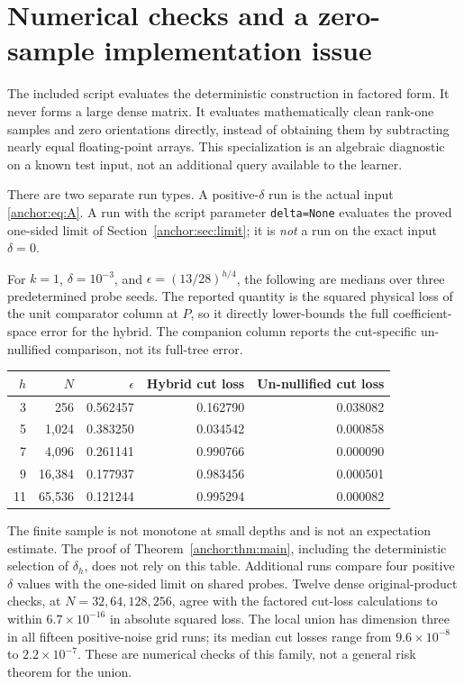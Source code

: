 \documentclass[11pt,oneside,openany,a4paper]{book}
\numberwithin{equation}{chapter}
\theoremstyle{definition}
\theoremstyle{remark}
\begin{document}
\section{Numerical checks and a zero-sample implementation issue}\label{anchor:sec:checks}
The included script evaluates the deterministic construction in factored form. It never forms a large dense matrix. It evaluates mathematically clean rank-one samples and zero orientations directly, instead of obtaining them by subtracting nearly equal floating-point arrays. This specialization is an algebraic diagnostic on a known test input, not an additional query available to the learner.

There are two separate run types. A positive-$\delta$ run is the actual input \eqref{anchor:eq:A}. A run with the script parameter \texttt{delta=None} evaluates the proved one-sided limit of Section~\ref{anchor:sec:limit}; it is \emph{not} a run on the exact input $\delta=0$.

For $k=1$, $\delta=10^{-3}$, and $\epsilon=(13/28)^{h/4}$, the following are medians over three predetermined probe seeds. The reported quantity is the squared physical loss of the unit comparator column at $P$, so it directly lower-bounds the full coefficient-space error for the hybrid. The companion column reports the cut-specific un-nullified comparison, not its full-tree error.
\begin{center}
\begin{tabular}{rrrrr}
\toprule
$h$&$N$&$\epsilon$&Hybrid cut loss&Un-nullified cut loss\\
\midrule
3&256&0.562457&0.162790&0.038082\\
5&1,024&0.383250&0.034542&0.000858\\
7&4,096&0.261141&0.990766&0.000090\\
9&16,384&0.177937&0.983456&0.000501\\
11&65,536&0.121244&0.995294&0.000082\\
\bottomrule
\end{tabular}
\end{center}
The finite sample is not monotone at small depths and is not an expectation estimate. The proof of Theorem~\ref{anchor:thm:main}, including the deterministic selection of $\delta_h$, does not rely on this table. Additional runs compare four positive $\delta$ values with the one-sided limit on shared probes. Twelve dense original-product checks, at $N=32,64,128,256$, agree with the factored cut-loss calculations to within $6.7\times10^{-16}$ in absolute squared loss. The local union has dimension three in all fifteen positive-noise grid runs; its median cut losses range from $9.6\times10^{-8}$ to $2.2\times10^{-7}$. These are numerical checks of this family, not a general risk theorem for the union.
\end{document}
